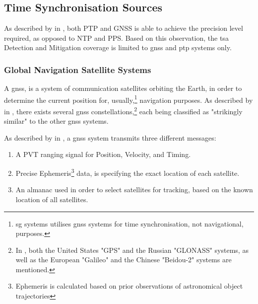 \subsection{Time Synchronisation Sources}

As described by \citeauthor{moussa2016security} in \cite{moussa2016security}, both PTP and GNSS is able to achieve the precision level required, as opposed to NTP and PPS.  Based on this observation, the \acrshort{tsa} Detection and Mitigation coverage is limited to \acrshort{gnss} and  \acrshort{ptp} systems only.




\subsubsection{Global Navigation Satellite Systems}

A \acrfull{gnss}, is a system of communication satellites orbiting the Earth, in order to determine the current position for, usually,\footnote{\acrlong{sg} systems utilises \acrshort{gnss} systems for time synchronisation, not navigational, purposes.} navigation  purposes. As described by \citeauthor{schmidt2016survey} in \cite{schmidt2016survey}, there exists several \acrshort{gnss} constellations,\footnote{In \cite{schmidt2016survey}, both the United States "GPS" and the Russian "GLONASS" systems, as well as the European "Galileo" and the Chinese "Beidou-2" systems are mentioned.} each being classified as "strikingly similar" to the other \acrshort{gnss} systems. 








As described by \citeauthor{schmidt2016survey} in  \cite{schmidt2016survey},  a \acrshort{gnss} system transmits three different messages:

\begin{enumerate}
    \item A PVT ranging signal for Position, Velocity, and Timing.
    \item Precise Ephemeris\footnote{Ephemeris is calculated based on prior observations of astronomical object trajectories} data, is specifying the exact location of each satellite.
    \item An almanac used in order to select satellites for tracking, based on the known location of all satellites. 
    
\end{enumerate}

